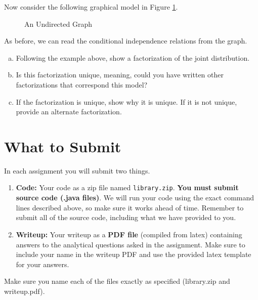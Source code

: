 \documentclass[11pt]{article}
\begin{document}
Now consider the following graphical model in Figure \ref{fig:utm}.
\begin{figure}[h]
	\begin{center}
		\caption{An Undirected Graph}
			\label{fig:utm}
		\end{center}
\end{figure}

As before, we can read the conditional independence relations from the graph. 
\begin{enumerate}[(a)]
\item Following the example above, show a factorization of the joint distribution.
\item Is this factorization unique, meaning, could you have written other factorizations that correspond this model?
\item If the factorization is unique, show why it is unique. If it is not unique, provide an alternate factorization.
\end{enumerate}




\section{What to Submit}
In each assignment you will submit two things.
\begin{enumerate}
\item {\bf Code:} Your code as a zip file named {\tt library.zip}. {\bf You must submit source code (.java files)}. We will run your code using the exact command lines described above, so make sure it works ahead of time. Remember to submit all of the source code, including what we have provided to you.
\item {\bf Writeup:} Your writeup as a {\bf PDF file} (compiled from latex) containing answers to the analytical questions asked in the assignment. Make sure to include your name in the writeup PDF and use the provided latex template for your answers.
\end{enumerate}
Make sure you name each of the files exactly as specified (library.zip and writeup.pdf).
\end{document}
